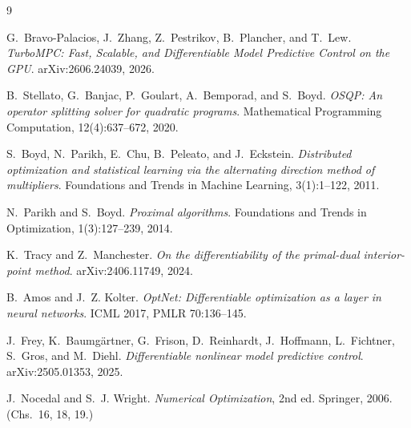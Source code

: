 \documentclass[10pt,twocolumn]{article}
\begin{document}
\begin{thebibliography}{9}\footnotesize
\itemsep1pt

G.~Bravo-Palacios, J.~Zhang, Z.~Pestrikov, B.~Plancher, and T.~Lew.
\emph{TurboMPC: Fast, Scalable, and Differentiable Model Predictive Control on the
GPU}. arXiv:2606.24039, 2026.

B.~Stellato, G.~Banjac, P.~Goulart, A.~Bemporad, and S.~Boyd.
\emph{OSQP: An operator splitting solver for quadratic programs}.
Mathematical Programming Computation, 12(4):637--672, 2020.

S.~Boyd, N.~Parikh, E.~Chu, B.~Peleato, and J.~Eckstein.
\emph{Distributed optimization and statistical learning via the alternating
direction method of multipliers}.
Foundations and Trends in Machine Learning, 3(1):1--122, 2011.

N.~Parikh and S.~Boyd.
\emph{Proximal algorithms}.
Foundations and Trends in Optimization, 1(3):127--239, 2014.

K.~Tracy and Z.~Manchester.
\emph{On the differentiability of the primal-dual interior-point method}.
arXiv:2406.11749, 2024.

B.~Amos and J.~Z. Kolter.
\emph{OptNet: Differentiable optimization as a layer in neural networks}.
ICML 2017, PMLR 70:136--145.

J.~Frey, K.~Baumg\"artner, G.~Frison, D.~Reinhardt, J.~Hoffmann, L.~Fichtner,
S.~Gros, and M.~Diehl.
\emph{Differentiable nonlinear model predictive control}.
arXiv:2505.01353, 2025.

J.~Nocedal and S.~J. Wright.
\emph{Numerical Optimization}, 2nd ed. Springer, 2006. (Chs.~16, 18, 19.)

\end{thebibliography}
\end{document}
